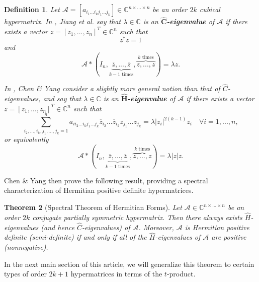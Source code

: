 \documentclass[11pt]{article}
\newtheorem{theorem}{Theorem}[section]
\newtheorem{defn}[theorem]{Definition}
\begin{document}
\begin{defn} 
    Let $\mathcal{A} = [a_{i_1...i_kj_1...j_k}]\in \mathbb{C}^{n\times...\times n}$ be an order $2k$ cubical hypermatrix. In \cite{jiang2016characterizing}, Jiang et al. say that $\lambda\in \mathbb{C}$ is an \textbf{$\boldsymbol{\widehat{C}}$-eigenvalue} of $\mathcal{A}$ if there exists a vector $z = [z_1,...,z_n]^T\in \mathbb{C}^n$ such that 
    \[z^{\dagger}z = 1\]
    and 
    \[\mathcal{A}*(I_n,\underbrace{\overline{z},...,\overline{z}}_{k-1\text{ times}},\overbrace{z,...,z}^{k\text{ times}}) = \lambda z.\]
    
    In \cite{chen2025hat}, Chen \& Yang consider a slightly more general notion than that of $\widehat{C}$-eigenvalues, and say that  $\lambda\in \mathbb{C}$ is an \textbf{$\boldsymbol{\widehat{H}}$-eigenvalue} of $\mathcal{A}$ if there exists a vector $z = [z_1,...,z_n]^T\in \mathbb{C}^n$ such that 
    \[\sum\limits_{i_2,...,i_k,j_1,...,j_k=1}^na_{ii_2...i_kj_1...j_k}\overline{z}_{i_2}...\overline{z}_{i_k}z_{j_1}...z_{j_k} = \lambda |z_i|^{2(k-1)}z_i\quad \forall i=1,...,n,\]
    or equivalently
    \[\mathcal{A}*(I_n,\underbrace{\overline{z},...,\overline{z}}_{k-1\text{ times}},\overbrace{z,...,z}^{k\text{ times}}) = \lambda |z| z.\]
\end{defn}
Chen \& Yang then prove the following result, providing a spectral characterization of Hermitian positive definite hypermatrices. 
\begin{theorem}[Spectral Theorem of Hermitian Forms]\cite[Theorem 1.4]{chen2025hat}\label{Spectral Theorem of Hermitian Forms}
    Let $\mathcal{A}\in \mathbb{C}^{n\times...\times n}$ be an order $2k$ conjugate partially symmetric hypermatrix. Then there always exists $\widehat{H}$-eigenvalues (and hence $\widehat{C}$-eigenvalues) of $\mathcal{A}$. Moreover, $\mathcal{A}$ is Hermitian positive definite (semi-definite) if and only if all of the $\widehat{H}$-eigenvalues of $\mathcal{A}$ are positive (nonnegative). 
\end{theorem}
In the next main section of this article, we will generalize this theorem to certain types of order $2k+1$ hypermatrices in terms of the $t$-product. 
\end{document}
